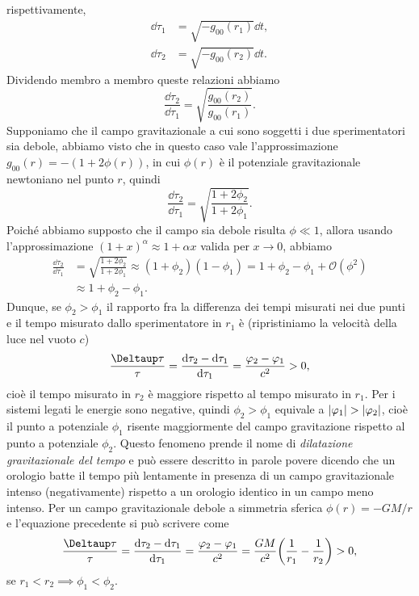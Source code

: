 rispettivamente,
\begin{subequations}
  \begin{align}
    \dd\tau_{1} &= \sqrt{-g_{00}(r_{1})} \dd t, \\
    \dd\tau_{2} &= \sqrt{-g_{00}(r_{2})} \dd t.
  \end{align}
\end{subequations}
Dividendo membro a membro queste relazioni abbiamo
\begin{equation}
  \frac{\dd \tau_{2}}{\dd \tau_{1}} =
  \sqrt{\frac{g_{00}(r_{2})}{g_{00}(r_{1})}}.
\end{equation}
Supponiamo che il campo gravitazionale a cui sono soggetti i due sperimentatori
sia debole, abbiamo visto che in questo caso vale l'approssimazione
$g_{00}(r) = -(1 + 2\phi(r))$, in cui $\phi(r)$ è il potenziale gravitazionale
newtoniano nel punto $r$, quindi
\begin{equation}
  \frac{\dd\tau_{2}}{\dd\tau_{1}} = \sqrt{\frac{1 + 2\phi_{2}}{1 + 2\phi_{1}}}.
\end{equation}
Poiché abbiamo supposto che il campo sia debole risulta $\phi \ll 1$, allora
usando l'approssimazione $(1+x)^{\alpha} \approx 1 + \alpha x$ valida per
$x \to 0$, abbiamo
\begin{equation}
  \begin{split}
    \frac{\dd \tau_{2}}{\dd \tau_{1}} &=
    \sqrt{\frac{1 + 2\phi_{2}}{1 + 2\phi_{1}}} \approx (1 + \phi_{2}) (1 -
    \phi_{1}) = 1 + \phi_{2} - \phi_{1} + \mathcal{O}(\phi^{2}) \\
    &\approx 1 + \phi_{2} - \phi_{1}.
  \end{split}
\end{equation}
Dunque, se $\phi_{2} > \phi_{1}$ il rapporto fra la differenza dei tempi
misurati nei due punti e il tempo misurato dallo sperimentatore in $r_{1}$ è
(ripristiniamo la velocità della luce nel vuoto $c$)
\begin{equation}
  \frac{\var\tau}{\tau} = \frac{\dd\tau_{2} - \dd\tau_{1}}{\dd\tau_{1}} =
  \frac{\phi_{2} - \phi_{1}}{c^{2}} > 0,
\end{equation}
cioè il tempo misurato in $r_{2}$ è maggiore rispetto al tempo misurato in
$r_{1}$.  Per i sistemi legati le energie sono negative, quindi
$\phi_{2} > \phi_{1}$ equivale a $\lvert\varphi_{1}\rvert > \lvert\varphi_{2}\rvert$, cioè il
punto a potenziale $\phi_{1}$ risente maggiormente del campo gravitazione
rispetto al punto a potenziale $\phi_{2}$.  Questo fenomeno prende il nome di
\emph{dilatazione gravitazionale del tempo} e può essere descritto in parole
povere dicendo che un orologio batte il tempo più lentamente in presenza di un
campo gravitazionale intenso (negativamente) rispetto a un orologio identico in
un campo meno intenso.  Per un campo gravitazionale debole a simmetria sferica
$\phi(r) = -GM/r$ e l'equazione precedente si può scrivere come
\begin{equation}
  \frac{\var\tau}{\tau} = \frac{\dd\tau_{2} - \dd\tau_{1}}{\dd\tau_{1}} =
  \frac{\phi_{2} - \phi_{1}}{c^{2}} = \frac{GM}{c^{2}}\bigg(\frac{1}{r_{1}} -
  \frac{1}{r_{2}} \bigg) > 0,
\end{equation}
se $r_{1} < r_{2} \implies \phi_{1} < \phi_{2}$.

